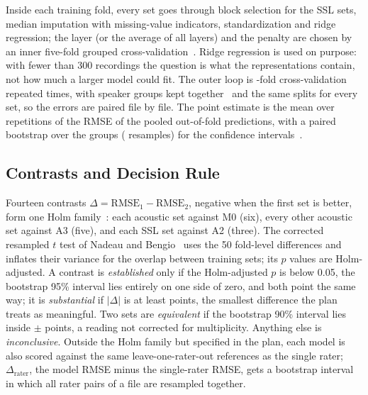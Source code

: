 \documentclass[journal]{IEEEtran}
\begin{document}
Inside each training fold, every set goes through block selection for the SSL sets, median imputation with missing-value indicators, standardization and ridge regression; the layer (or the average of all layers) and the penalty are chosen by an inner five-fold grouped cross-validation~\cite{varma2006bias}. Ridge regression is used on purpose: with fewer than 300 recordings the question is what the representations contain, not how much a larger model could fit. The outer loop is \outerSplits{}-fold cross-validation repeated \repeats{} times, with speaker groups kept together~\cite{saeb2017need} and the same splits for every set, so the errors are paired file by file. The point estimate is the mean over repetitions of the RMSE of the pooled out-of-fold predictions, with a paired bootstrap over the \cvGroups{} groups (\resamples{} resamples) for the confidence intervals~\cite{davison1997bootstrap}.

\subsection{Contrasts and Decision Rule}
Fourteen contrasts $\Delta = \mathrm{RMSE}_1 - \mathrm{RMSE}_2$, negative when the first set is better, form one Holm family~\cite{holm1979simple}: each acoustic set against M0 (six), every other acoustic set against A3 (five), and each SSL set against A2 (three). The corrected resampled $t$ test of Nadeau and Bengio~\cite{nadeau2003inference} uses the 50 fold-level differences and inflates their variance for the overlap between training sets; its $p$ values are Holm-adjusted. A contrast is \emph{established} only if the Holm-adjusted $p$ is below 0.05, the bootstrap 95\% interval lies entirely on one side of zero, and both point the same way; it is \emph{substantial} if $|\Delta|$ is at least \margin{} points, the smallest difference the plan treats as meaningful. Two sets are \emph{equivalent} if the bootstrap 90\% interval lies inside $\pm$\margin{} points, a reading not corrected for multiplicity. Anything else is \emph{inconclusive}. Outside the Holm family but specified in the plan, each model is also scored against the same leave-one-rater-out references as the single rater; $\Delta_{\mathrm{rater}}$, the model RMSE minus the single-rater RMSE, gets a bootstrap interval in which all rater pairs of a file are resampled together.
\end{document}
